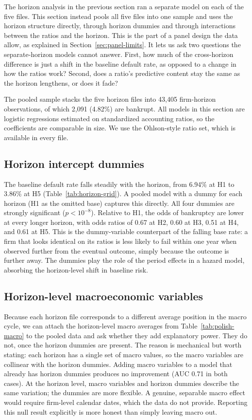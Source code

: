 \documentclass[12pt,a4paper]{article}
\begin{document}
The horizon analysis in the previous section ran a separate model on each of
the five files. This section instead pools all five files into one sample and uses the
horizon structure directly, through horizon dummies and through interactions
between the ratios and the horizon. This is the part of a panel design the
data allow, as explained in Section~\ref{sec:panel-limits}. It lets us ask
two questions the separate-horizon models cannot answer. First, how much of
the cross-horizon difference is just a shift in the baseline default rate,
as opposed to a change in how the ratios work? Second, does a ratio's
predictive content stay the same as the horizon lengthens, or does it fade?

The pooled sample stacks the five horizon files into 43,405 firm-horizon
observations, of which 2,091 (4.82\%) are bankrupt. All models in this section
are logistic regressions estimated on standardized accounting ratios, so the
coefficients are comparable in size. We use the Ohlson-style ratio set, which
is available in every file.

\subsection{Horizon intercept dummies}

The baseline default rate falls steadily with the horizon, from 6.94\% at H1
to 3.86\% at H5 (Table~\ref{tab:horizon-grid}). A pooled model with a dummy for
each horizon (H1 as the omitted base) captures this directly. All four dummies
are strongly significant ($p < 10^{-8}$). Relative to H1, the odds of
bankruptcy are lower at every longer horizon, with odds ratios of 0.67 at H2,
0.60 at H3, 0.51 at H4, and 0.61 at H5. This is the dummy-variable counterpart
of the falling base rate: a firm that looks identical on its ratios is less
likely to fail within one year when observed further from the eventual outcome,
simply because the outcome is further away. The dummies play the role of the
period effects in a hazard model, absorbing the horizon-level shift in baseline
risk.

\subsection{Horizon-level macroeconomic variables}

Because each horizon file corresponds to a different average position in the
macro cycle, we can attach the horizon-level macro averages from
Table~\ref{tab:polish-macro} to the pooled data and ask whether they add
explanatory power. They do not, once the horizon dummies are present. The
reason is mechanical but worth stating: each horizon has a single set of macro
values, so the macro variables are collinear with the horizon dummies. Adding macro variables to a model that already has horizon dummies produces
no improvement (AUC 0.71 in both cases). At the horizon level, macro
variables and horizon dummies describe the same variation; the dummies are
more flexible. A genuine, separable macro effect would require firm-level
calendar dates, which the data do not provide. Reporting this null result
explicitly is more honest than simply leaving macro out.
\end{document}
